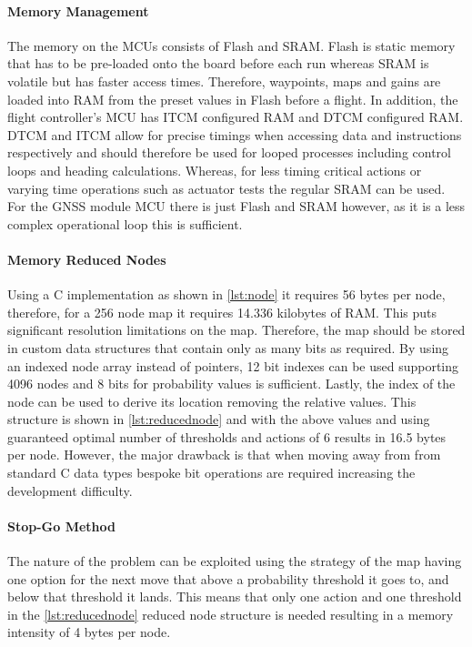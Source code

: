 \paragraph{Memory Management}
The memory on the \gls{MCU}s consists of Flash and \gls{SRAM}. Flash is static memory that has to be pre-loaded onto the board before each run whereas \gls{SRAM} is volatile but has faster access times. Therefore, waypoints, maps and gains are loaded into \gls{RAM} from the preset values in Flash before a flight. In addition, the flight controller's \gls{MCU} has \gls{ITCM} configured \gls{RAM} and \gls{DTCM} configured \gls{RAM}. \gls{DTCM} and \gls{ITCM} allow for precise timings when accessing data and instructions respectively and should therefore be used for looped processes including control loops and heading calculations. Whereas, for less timing critical actions or varying time operations such as actuator tests the regular \gls{SRAM} can be used. For the \gls{GNSS} module \gls{MCU} there is just Flash and \gls{SRAM} however, as it is a less complex operational loop this is sufficient. 

\paragraph{Memory Reduced Nodes}
Using a C implementation as shown in \ref{lst:node} it requires 56 bytes per node, therefore, for a 256 node map it requires 14.336 kilobytes of \gls{RAM}. This puts significant resolution limitations on the map. Therefore, the map should be stored in custom data structures that contain only as many bits as required. By using an indexed node array instead of pointers, 12 bit indexes can be used supporting 4096 nodes and 8 bits for probability values is sufficient. Lastly, the index of the node can be used to derive its location removing the relative values. This structure is shown in \ref{lst:reducednode} and with the above values and using guaranteed optimal number of thresholds and actions of 6 results in 16.5 bytes per node. However, the major drawback is that when moving away from from standard C data types bespoke bit operations are required increasing the development difficulty. 
\paragraph{Stop-Go Method}
The nature of the problem can be exploited using the strategy of the map having one option for the next move that above a probability threshold it goes to, and below that threshold it lands. This means that only one action and one threshold in the \ref{lst:reducednode} reduced node structure is needed resulting in a memory intensity of 4 bytes per node. 
